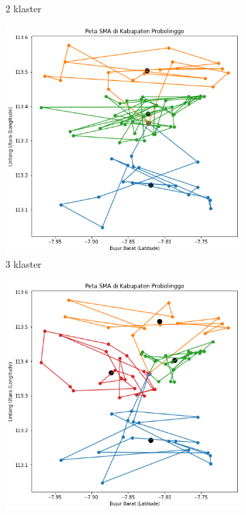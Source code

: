 \begin{figure}[H]
\begin{subfigure}[b]{0.3\textwidth}
		\caption{2 klaster}
		\label{fig:klasterbeda2}
	\end{subfigure}
	\hfill
	\begin{subfigure}[b]{0.3\textwidth}
		\includegraphics[width=\textwidth]{Gambar/hasil_mtsp/3.png}
		\caption{3 klaster}
		\label{fig:klasterbeda3}
	\end{subfigure}
	\hfill
	\begin{subfigure}[b]{0.3\textwidth}
		\includegraphics[width=\textwidth]{Gambar/hasil_mtsp/4.png}

\end{subfigure}
\end{figure}
